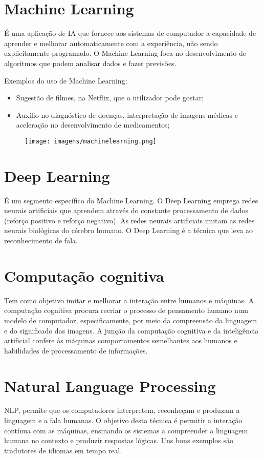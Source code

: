 \documentclass{report}
\begin{document}
\section{Machine Learning}
É uma aplicação de \ac{IA} que fornece aos sistemas de computador a capacidade de aprender e melhorar automaticamente com a experiência, não sendo explicitamente programado. O Machine Learning foca no desenvolvimento de algoritmos que podem analisar dados e fazer previsões.
\vspace{5pt}

Exemplos do uso de Machine Learning:
\begin{itemize}
    \item Sugestão de filmes, na Netflix, que o utilizador pode gostar;
    \item Auxílio no diagnóstico de doenças, interpretação de imagens médicas e aceleração no desenvolvimento de medicamentos;
\end{itemize}
\begin{figure}[ht]
    \centering
    \texttt{[image: imagens/machinelearning.png]}
    \caption{}
    \label{fig:machine}
\end{figure}
\clearpage

\section{Deep Learning}
É um segmento específico do Machine Learning. O Deep Learning emprega redes neurais artificiais que aprendem através do constante processamento de dados (reforço positivo e reforço negativo). As redes neurais artificiais imitam as redes neurais biológicas do cérebro humano. O Deep Learning é a técnica que leva ao reconhecimento de fala.

\section{Computação cognitiva}
Tem como objetivo imitar e melhorar a interação entre humanos e máquinas. A computação cognitiva procura recriar o processo de pensamento humano num modelo de computador, especificamente, por meio da compreensão da linguagem e do significado das imagens.
A junção da computação cognitiva e da inteligência artificial confere às máquinas comportamentos semelhantes aos humanos e habilidades de processamento de informações.

\section{Natural Language Processing}
\ac{NLP}, permite que os computadores interpretem, reconheçam e produzam a linguagem e a fala humanas.
O objetivo desta técnica é permitir a interação contínua com as máquinas, ensinando os sistemas a compreender a linguagem humana no contexto e produzir respostas lógicas. Uns bons exemplos são tradutores de idiomas em tempo real.
\end{document}
